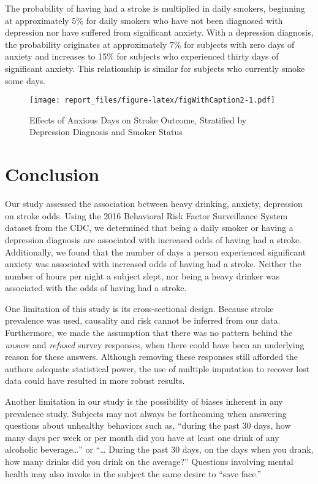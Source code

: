 \documentclass[11pt,]{article}
\begin{document}
The probability of having had a stroke is multiplied in daily smokers,
beginning at approximately 5\% for daily smokers who have not been
diagnosed with depression nor have suffered from significant anxiety.
With a depression diagnosis, the probability originates at approximately
7\% for subjects with zero days of anxiety and increases to 15\% for
subjects who experienced thirty days of significant anxiety. This
relationship is similar for subjects who currently smoke some days.

\begin{figure}
\centering
\texttt{[image: report\_files/figure-latex/figWithCaption2-1.pdf]}
\caption{Effects of Anxious Days on Stroke Outcome, Stratified by
Depression Diagnosis and Smoker Status}
\end{figure}

\hypertarget{conclusion}{%
\section{Conclusion}\label{conclusion}}

Our study assessed the association between heavy drinking, anxiety,
depression on stroke odds. Using the 2016 Behavioral Risk Factor
Surveillance System dataset from the CDC, we determined that being a
daily smoker or having a depression diagnosis are associated with
increased odds of having had a stroke. Additionally, we found that the
number of days a person experienced significant anxiety was associated
with increased odds of having had a stroke. Neither the number of hours
per night a subject slept, nor being a heavy drinker was associated with
the odds of having had a stroke.

One limitation of this study is its cross-sectional design. Because
stroke prevalence was used, causality and risk cannot be inferred from
our data. Furthermore, we made the assumption that there was no pattern
behind the \emph{unsure} and \emph{refused} survey responses, when there
could have been an underlying reason for these answers. Although
removing these responses still afforded the authors adequate statistical
power, the use of multiple imputation to recover lost data could have
resulted in more robust results.

Another limitation in our study is the possibility of biases inherent in
any prevalence study. Subjects may not always be forthcoming when
answering questions about unhealthy behaviors such as, ``during the past
30 days, how many days per week or per month did you have at least one
drink of any alcoholic beverage\ldots{}'' or ``\ldots{} During the past
30 days, on the days when you drank, how many drinks did you drink on
the average?'' Questions involving mental health may also invoke in the
subject the same desire to ``save face.''
\end{document}
